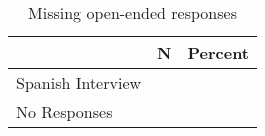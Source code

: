 \begin{table}[ht]
\centering
\begin{tabular}{lcc}
  \hline
 & N & Percent \\ 
  \hline
Spanish Interview &  &  \\ 
  No Responses &  &  \\ 
   \hline
\end{tabular}
\caption{Missing open-ended responses} 
\label{tab:app_mis}
\end{table}

